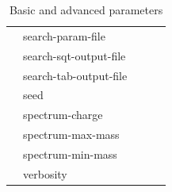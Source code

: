 \documentclass{article}
\begin{document}
\begin{table}
\begin{tabular}{lllll}
                     &search-param-file                 &                                 &                                 &                                 \\
                     &search-sqt-output-file            &                                 &                                 &                                 \\
                     &search-tab-output-file            &                                 &                                 &                                 \\
                     &seed                              &                                 &                                 &                                 \\
                     &spectrum-charge                   &                                 &                                 &                                 \\
                     &spectrum-max-mass                 &                                 &                                 &                                 \\
                     &spectrum-min-mass                 &                                 &                                 &                                 \\
                     &verbosity                         &                                 &                                 &                                 \\
\end{tabular}
\caption{Basic and advanced parameters}
\end{table}
\end{document}
